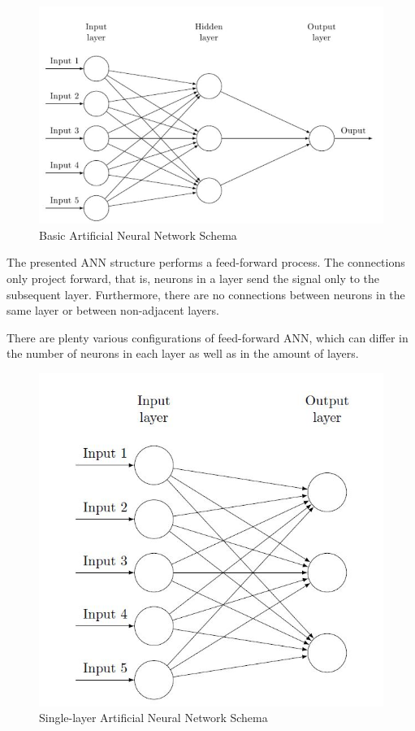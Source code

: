 \begin{figure}[H]
\centering
\includegraphics[scale=0.65]{ANN_schema.jpg}
\caption{Basic Artificial Neural Network Schema}
\end{figure} 

The presented ANN structure performs a feed-forward process. The connections only project forward, that is, neurons in a layer send the signal only to the subsequent layer. Furthermore, there are no connections between neurons in the same layer or between non-adjacent layers. 

There are plenty various configurations of feed-forward ANN, which can differ in the number of neurons in each layer as well as in the amount of layers. 

\begin{figure}[H]
\centering
\includegraphics[scale=0.65]{single_ANN_schema.jpg}
\caption{Single-layer Artificial Neural Network Schema}
\end{figure} 

